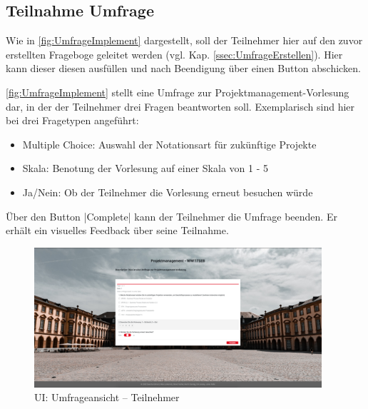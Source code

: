 
\subsection{Teilnahme Umfrage}
\label{ssec:UmfrageImplement}

Wie in \abb \vref{fig:UmfrageImplement} dargestellt, soll der Teilnehmer hier auf den zuvor erstellten Frageboge geleitet werden (vgl. Kap. \vref{ssec:UmfrageErstellen}). 
Hier kann dieser diesen ausfüllen und nach Beendigung über einen Button abschicken. 

\abb \vref{fig:UmfrageImplement} stellt eine Umfrage zur Projektmanagement-Vorlesung dar, in der der Teilnehmer drei Fragen beantworten soll. 
Exemplarisch sind hier bei drei Fragetypen angeführt: 
\begin{itemize}
	\item Multiple Choice: Auswahl der Notationsart für zukünftige Projekte
	\item Skala: Benotung der Vorlesung auf einer Skala von 1 - 5
	\item Ja/Nein: Ob der Teilnehmer die Vorlesung erneut besuchen würde 
\end{itemize}

Über den Button \jinline|Complete| kann der Teilnehmer die Umfrage beenden. 
Er erhält ein visuelles Feedback über seine Teilnahme.

\begin{figure}[hp]
	\centering
	\includegraphics[width=0.95\textwidth, keepaspectratio]{img/client/TeilnahmeUmfrage.png}
	\captionsetup{justification=centering, format=plain}
	\caption[\acf{UI}: Umfrageansicht -- Teilnehmer]{\acf{UI}: Umfrageansicht -- Teilnehmer \\ \quelleScreenshot}
	\label{fig:UmfrageImplement}
\end{figure}
